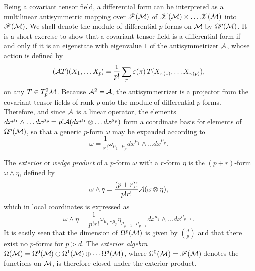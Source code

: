 \documentclass[
final,
11pt,
a4paper,
DIV=11,
headinclude=true,
footinclude=false,
bibliography=totoc,
twoside=true,  %
BCOR=5mm
]{scrbook}
\begin{document}
Being a covariant tensor field, a differential form can be 
interpreted as a multilinear antisymmetric mapping over 
$\mathscr{F}(\mathcal{M})$ of $\mathscr{X}(\mathcal{M}) \times \ldots 
\mathscr{X}(\mathcal{M})$ into $\mathscr{F}(\mathcal{M})$.  We shall denote 
the module of differential $p$-forms on $\mathcal{M}$ by 
$\Omega^p(\mathcal{M})$. It is a short exercise to show that a 
covariant tensor field is a differential form if and only if it 
is an eigenstate with eigenvalue $1$ of the antisymmetrizer 
$\mathcal{A}$, whose action is defined by
\begin{equation*}
  (\mathcal{A}T)(X_1,\ldots X_p) = \frac{1}{p!} \sum_\pi 
  \varepsilon(\pi) \, T(X_{\pi(1)},\ldots X_{\pi(p)}),
\end{equation*}
on any $T \in T^0_p\mathcal{M}$. Because $\mathcal{A}^2 = \mathcal{A}$, the 
antisymmetrizer is a projector from the covariant tensor fields 
of rank $p$ onto the module of differential $p$-forms. Therefore, 
and since $\mathcal{A}$ is a linear operator, the elements $dx^{\mu_1} 
\wedge \ldots dx^{\mu_p} = p! \mathcal{A}(dx^{\mu_1} \otimes \ldots 
dx^{\mu_p})$ form a coordinate basis for elements of 
$\Omega^p(\mathcal{M})$, so that a generic $p$-form $\omega$ may be 
expanded according to
\begin{equation*}
  \omega = \frac{1}{r!}\omega_{\mu_1\cdots \mu_p} dx^{\mu_1} 
  \wedge \dots dx^{\mu_p}.
\end{equation*}

The \emph{exterior} or \emph{wedge product} of a $p$-form 
$\omega$ with a $r$-form $\eta$ is the $(p+r)$-form $\omega 
\wedge \eta$, defined by
\begin{equation*}
  \omega \wedge \eta = \frac{(p+r)!}{p!r!} \mathcal{A}(\omega \otimes 
  \eta),
\end{equation*}
which in local coordinates is expressed as
\begin{equation*}
  \omega \wedge \eta = \frac{1}{p!r!} \omega_{\mu_1\cdots \mu_p} 
  \eta_{\mu_{p+1}\cdots \mu_{p+r}} dx^{\mu_1} \wedge \ldots 
  dx^{\mu_{p+r}}.
\end{equation*}
It is easily seen that the dimension of $\Omega^p(\mathcal{M})$ is 
given by $\binom{d}{p}$ and that there exist no $p$-forms for $p 
> d$. The \emph{exterior algebra} $\Omega(\mathcal{M}) = 
\Omega^0(\mathcal{M}) \oplus \Omega^1(\mathcal{M}) \oplus \cdots 
\Omega^d(\mathcal{M})$, where $\Omega^0(\mathcal{M}) = \mathscr{F}(\mathcal{M})$ 
denotes the functions on $\mathcal{M}$, is therefore closed under the 
exterior product.
\end{document}
